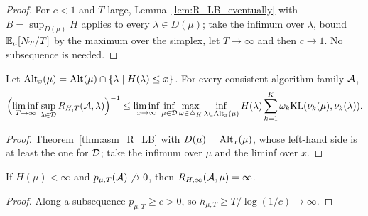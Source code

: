 \begin{proof}
  \leanok
  For $c < 1$ and $T$ large, Lemma~\ref{lem:R_LB_eventually} with $B = \sup_{D(\mu)} H$ applies to
  every $\lambda \in D(\mu)$; take the infimum over $\lambda$, bound $\mathbb{E}_{\mu}[N_T / T]$ by the
  maximum over the simplex, let $T \to \infty$ and then $c \to 1$. No subsequence is needed.
\end{proof}

\begin{corollary}[{\cite[Corollary 14]{D23}}]
  \label{cor:asm_R_LB_all}
  \leanok
  Let $\mathrm{Alt}_x(\mu) = \mathrm{Alt}(\mu) \cap \{\lambda \mid H(\lambda) \le x\}$. For every consistent
  algorithm family $\mathcal{A}$,
  \[ \Bigl(\liminf_{T \to \infty} \sup_{\lambda \in \mathcal{D}} R_{H,T}(\mathcal{A}, \lambda)\Bigr)^{-1}
    \le \liminf_{x \to \infty} \inf_{\mu \in \mathcal{D}} \max_{\omega \in \triangle_K}
    \inf_{\lambda \in \mathrm{Alt}_x(\mu)} H(\lambda) \sum_{k=1}^K \omega_k \mathrm{KL}(\nu_k(\mu), \nu_k(\lambda)). \]
\end{corollary}

\begin{proof}
  \leanok
  Theorem~\ref{thm:asm_R_LB} with $D(\mu) = \mathrm{Alt}_x(\mu)$, whose left-hand side is at least the one
  for $\mathcal{D}$; take the infimum over $\mu$ and the liminf over $x$.
\end{proof}

\begin{lemma}
  \label{lem:asymptoticRatio_eq_top}
  \leanok
  If $H(\mu) < \infty$ and $p_{\mu, T}(\mathcal{A}) \not\to 0$, then
  $R_{H, \infty}(\mathcal{A}, \mu) = \infty$.
\end{lemma}

\begin{proof}
  \leanok
  Along a subsequence $p_{\mu, T} \ge c > 0$, so $h_{\mu, T} \ge T / \log(1/c) \to \infty$.
\end{proof}
